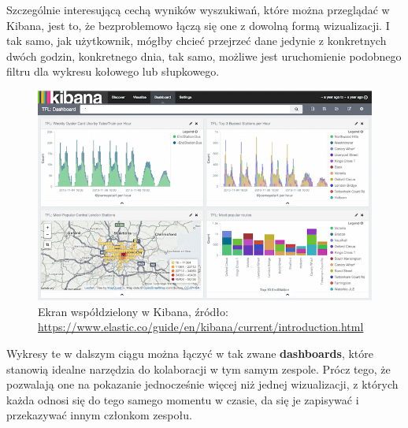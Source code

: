     Szczególnie interesującą cechą wyników wyszukiwań, które można przeglądać w Kibana, jest to, że bezproblemowo
    łączą się one z dowolną formą wizualizacji. I tak samo, jak użytkownik, mógłby chcieć przejrzeć dane 
    jedynie z konkretnych dwóch godzin, konkretnego dnia, tak samo, możliwe jest uruchomienie podobnego
    filtru dla wykresu kołowego lub słupkowego.
    \begin{figure}[H]
        \centering
        \includegraphics[width=1.0\textwidth]{images/kibana_dashboards}
        \caption[Ekran współdzielony w Kibana]{
            Ekran współdzielony w Kibana, źródło: \url{https://www.elastic.co/guide/en/kibana/current/introduction.html}
        }
        \label{chapter:application:elkstack:kibana:dashboard}
    \end{figure}
    Wykresy te w dalszym ciągu można łączyć w tak zwane \textbf{dashboards}, które stanowią idealne narzędzia do kolaboracji
    w tym samym zespole. Prócz tego, że pozwalają one na pokazanie jednocześnie więcej niż jednej wizualizacji, z których
    każda odnosi się do tego samego momentu w czasie, da się je zapisywać i przekazywać innym członkom zespołu. 